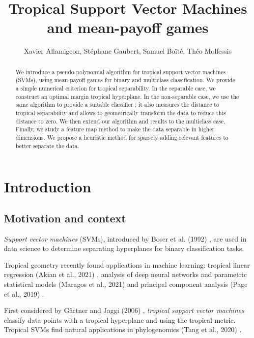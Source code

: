 \documentclass[oneside,UKenglish,a4paper]{amsart}
\numberwithin{equation}{section}
\numberwithin{figure}{section}
\theoremstyle{plain}
\theoremstyle{definition}
\theoremstyle{plain}
\theoremstyle{remark}
\theoremstyle{plain}
\theoremstyle{definition}
\theoremstyle{definition}
\begin{document}
\title{Tropical Support Vector Machines and mean-payoff games}
\author{Xavier Allamigeon, Stéphane Gaubert, Samuel Boïté, Théo Molfessis}
\maketitle

\begin{abstract}
    We introduce a pseudo-polynomial algorithm for tropical support vector machines (SVMs), using mean-payoff games for binary and multiclass classification. We provide a simple numerical criterion for tropical separability. In the separable case, we construct an optimal margin tropical hyperplane. In the non-separable case, we use the same algorithm to provide a suitable classifier ; it also measures the distance to tropical separability and allows to geometrically transform the data to reduce this distance to zero. We then extend our algorithm and results to the multiclass case. Finally, we study a feature map method to make the data separable in higher dimensions. We propose a heuristic method for sparsely adding relevant features to better separate the data. 
\end{abstract}


\section{Introduction}

\subsection*{Motivation and context}
\emph{Support vector machines} (SVMs), introduced by Boser et al. (1992) \cite{Boser92}, are used in data science to determine separating hyperplanes for binary classification tasks.

Tropical geometry recently found applications in machine learning: tropical linear regression (Akian et al., 2021) \cite{Akian2021TropicalLR}, analysis of deep neural networks and parametric statistical models (Maragos et al., 2021) \cite{Vasileios2021} and principal component analysis (Page et al., 2019) \cite{YoshidaPCA2019}.

First considered by Gärtner and Jaggi (2006) \cite{Gartner2006}, \emph{tropical support vector machines} classify data points with a tropical hyperplane and using the tropical metric. Tropical SVMs find natural applications in phylogenomics (Tang et al., 2020) \cite{Tang2020}.
\end{document}
